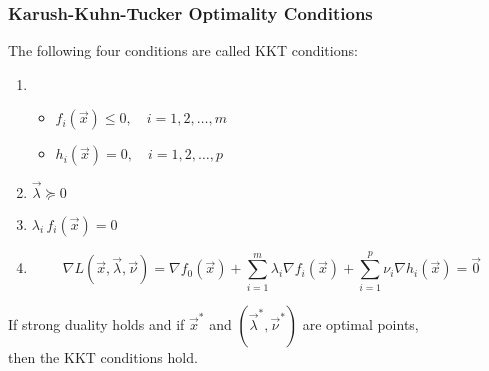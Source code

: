 \begin{frame}
  \frametitle{Karush-Kuhn-Tucker Optimality Conditions}
  
  The following four conditions are called KKT conditions: \\[3mm] \pause
  
  \begin{enumerate}
    \item {} 
      \begin{itemize}
        \item $f_i(\vec{x}) \leq 0, \quad i = 1, 2, \dots, m$
        \item $h_i(\vec{x}) =    0, \quad i = 1, 2, \dots, p$ \\[3mm] \pause
      \end{itemize}
    \item {} $\vec \lambda \succeq 0$ \\[3mm] \pause
    \item {} $ \lambda_i \, f_i(\vec{x})= 0$ \\[3mm] \pause
    \item {}
      \begin{displaymath}
        \nabla L(\vec x, \vec \lambda, \vec \nu) = 
        \nabla f_0(\vec{x}) + 
        \sum_{i=1}^m\lambda_i \nabla f_i(\vec{x}) +        
        \sum_{i=1}^p\nu_i \nabla h_i(\vec{x}) = 
        \vec{0}
      \end{displaymath}
  \end{enumerate}
   \pause
    
   If strong duality holds and if $\vec x^*$ and $(\vec \lambda^*, \vec \nu^*)$ are optimal points, \\
   then the KKT conditions hold.
\end{frame}


